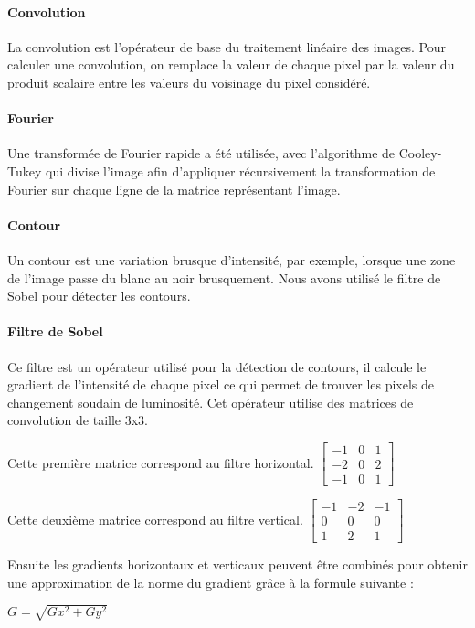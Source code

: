 	\paragraph{Convolution}
	\label{Convolution}

	La convolution est l'opérateur de base du traitement linéaire des images. Pour calculer une convolution, on remplace la valeur de chaque pixel par la valeur du produit scalaire entre les valeurs du voisinage du pixel considéré.

	\paragraph{Fourier}
	\label{Fourier}

	Une transformée de Fourier rapide a été utilisée, avec l'algorithme de Cooley-Tukey qui divise l'image afin d'appliquer récursivement la transformation de Fourier sur chaque ligne de la matrice représentant l'image.

	\paragraph{Contour}
	
	Un contour est une variation brusque d'intensité, par exemple, lorsque une zone de l'image passe du blanc au noir brusquement. Nous avons utilisé le filtre de Sobel pour détecter les contours.

	\paragraph{Filtre de Sobel}

	Ce filtre est un opérateur utilisé pour la détection de contours, il calcule le gradient de l'intensité de chaque pixel ce qui permet de trouver les pixels de changement soudain de luminosité. Cet opérateur utilise des matrices de convolution de taille 3x3.

Cette première matrice correspond au filtre horizontal.
$
	\begin{bmatrix}
		-1 & 0 & 1 \\
		-2 & 0 & 2 \\
		-1 & 0 & 1
	\end{bmatrix}
$

Cette deuxième matrice correspond au filtre vertical.
$
	\begin{bmatrix}
		-1 & -2 & -1 \\
		 0 & 0 & 0 \\
		 1 & 2 & 1
	\end{bmatrix}
$

Ensuite les gradients horizontaux et verticaux peuvent être combinés pour obtenir une approximation de la norme du gradient grâce à la formule suivante : 

$G=\sqrt{Gx^2+Gy^2}$